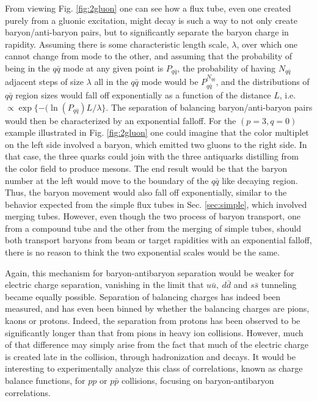 \documentclass[aps, prc, 12pt, nofootinbib, showpacs, superscriptaddress, tightenlines, groupedaddress]{revtex4-2}
\begin{document}
From viewing Fig. \ref{fig:2gluon} one can see how a flux tube, even one created purely from a gluonic excitation, might decay is such a way to not only create baryon/anti-baryon pairs, but to significantly separate the baryon charge in rapidity. Assuming there is some characteristic length scale, $\lambda$, over which one cannot change from mode to the other, and assuming that the probability of being in the $q\bar{q}$ mode at any given point is $P_{q\bar{q}}$, the probability of having $N_{q\bar{q}}$  adjacent steps of size $\lambda$ all in the $q\bar{q}$ mode would be $P_{q\bar{q}}^{N_{q\bar{q}}}$, and the distributions of $q\bar{q}$ region sizes would fall off exponentially as a function of the distance $L$, i.e. $\propto \exp\{-(\ln(P_{q\bar{q}})L/\lambda\}$. The separation of balancing baryon/anti-baryon pairs would then be characterized by an exponential falloff. For the $(p=3,q=0)$ example illustrated in Fig. \ref{fig:2gluon} one could imagine that the color multiplet on the left side involved a baryon, which emitted two gluons to the right side. In that case, the three quarks could join with the three antiquarks distilling from the color field to produce mesons. The end result would be that the baryon number at the left would move to the boundary of the $q\bar{q}$ like decaying region. Thus, the baryon movement would also fall off exponentially, similar to the behavior expected from the simple flux tubes in Sec. \ref{sec:simple}, which involved merging tubes. However, even though the two process of baryon transport, one from a compound tube and the other from the merging of simple tubes, should both transport baryons from beam or target rapidities with an exponential falloff, there is no reason to think the two exponential scales would be the same.

Again, this mechanism for baryon-antibaryon separation would be  weaker for electric charge separation, vanishing in the limit that $u\bar{u},~d\bar{d}$ and $s\bar{s}$ tunneling became equally possible. Separation of balancing charges has indeed been measured, and has even been binned by whether the balancing charges are pions, kaons or protons. Indeed, the separation from protons has been observed to be significantly longer than that from pions in heavy ion collisions. However, much of that difference may simply arise from the fact that much of the electric charge is created late in the collision, through hadronization and decays. It would be interesting to experimentally analyze this class of correlations, known as charge balance functions, for $pp$ or $p\bar{p}$ collisions, focusing on baryon-antibaryon correlations.
\end{document}
